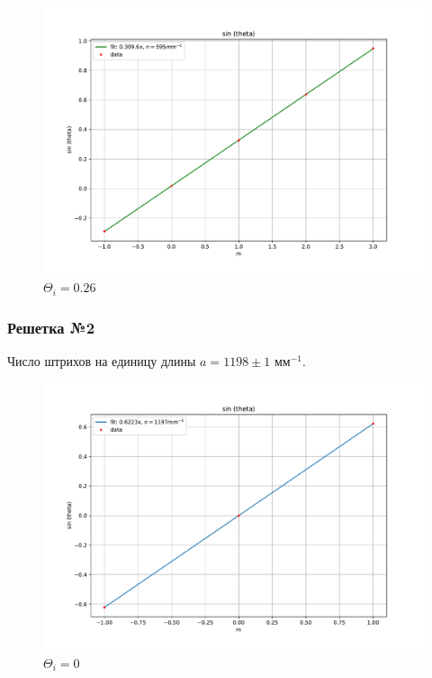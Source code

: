 \documentclass[a4paper, 12pt]{article}
\begin{document}
\begin{figure}[H]
	\centering
	\includegraphics[scale=0.5]{1_2}
	\caption{$ \Theta_i = 0.26$}
\end{figure}



\subsubsection{Решетка №2}
Число штрихов на единицу длины $a = 1198 \pm 1  \text{ мм}^{-1}$.

\begin{figure}[H]
	\centering
	\includegraphics[scale=0.55]{2_0}
	\caption{$ \Theta_i = 0$}
\end{figure}
\end{document}
